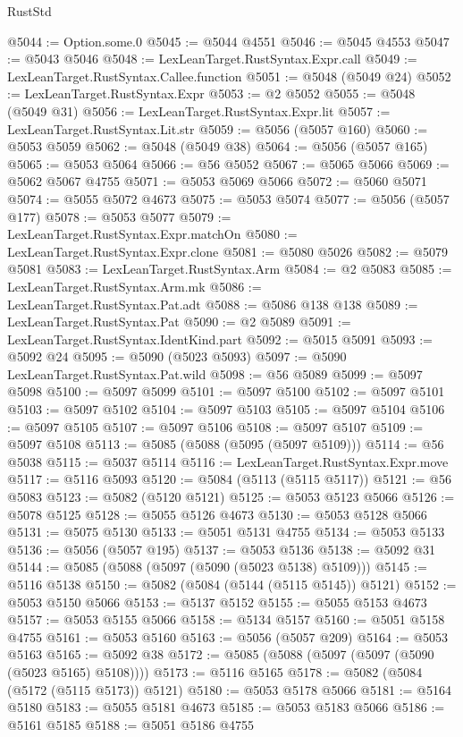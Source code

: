 \begin{lexlean}{RustStd}
\begin{coremodule}
@5044 := Option.some.{0}
@5045 := @5044 @4551
@5046 := @5045 @4553
@5047 := @5043 @5046
@5048 := LexLeanTarget.RustSyntax.Expr.call
@5049 := LexLeanTarget.RustSyntax.Callee.function
@5051 := @5048 (@5049 @24)
@5052 := LexLeanTarget.RustSyntax.Expr
@5053 := @2 @5052
@5055 := @5048 (@5049 @31)
@5056 := LexLeanTarget.RustSyntax.Expr.lit
@5057 := LexLeanTarget.RustSyntax.Lit.str
@5059 := @5056 (@5057 @160)
@5060 := @5053 @5059
@5062 := @5048 (@5049 @38)
@5064 := @5056 (@5057 @165)
@5065 := @5053 @5064
@5066 := @56 @5052
@5067 := @5065 @5066
@5069 := @5062 @5067 @4755
@5071 := @5053 @5069 @5066
@5072 := @5060 @5071
@5074 := @5055 @5072 @4673
@5075 := @5053 @5074
@5077 := @5056 (@5057 @177)
@5078 := @5053 @5077
@5079 := LexLeanTarget.RustSyntax.Expr.matchOn
@5080 := LexLeanTarget.RustSyntax.Expr.clone
@5081 := @5080 @5026
@5082 := @5079 @5081
@5083 := LexLeanTarget.RustSyntax.Arm
@5084 := @2 @5083
@5085 := LexLeanTarget.RustSyntax.Arm.mk
@5086 := LexLeanTarget.RustSyntax.Pat.adt
@5088 := @5086 @138 @138
@5089 := LexLeanTarget.RustSyntax.Pat
@5090 := @2 @5089
@5091 := LexLeanTarget.RustSyntax.IdentKind.part
@5092 := @5015 @5091
@5093 := @5092 @24
@5095 := @5090 (@5023 @5093)
@5097 := @5090 LexLeanTarget.RustSyntax.Pat.wild
@5098 := @56 @5089
@5099 := @5097 @5098
@5100 := @5097 @5099
@5101 := @5097 @5100
@5102 := @5097 @5101
@5103 := @5097 @5102
@5104 := @5097 @5103
@5105 := @5097 @5104
@5106 := @5097 @5105
@5107 := @5097 @5106
@5108 := @5097 @5107
@5109 := @5097 @5108
@5113 := @5085 (@5088 (@5095 (@5097 @5109)))
@5114 := @56 @5038
@5115 := @5037 @5114
@5116 := LexLeanTarget.RustSyntax.Expr.move
@5117 := @5116 @5093
@5120 := @5084 (@5113 (@5115 @5117))
@5121 := @56 @5083
@5123 := @5082 (@5120 @5121)
@5125 := @5053 @5123 @5066
@5126 := @5078 @5125
@5128 := @5055 @5126 @4673
@5130 := @5053 @5128 @5066
@5131 := @5075 @5130
@5133 := @5051 @5131 @4755
@5134 := @5053 @5133
@5136 := @5056 (@5057 @195)
@5137 := @5053 @5136
@5138 := @5092 @31
@5144 := @5085 (@5088 (@5097 (@5090 (@5023 @5138) @5109)))
@5145 := @5116 @5138
@5150 := @5082 (@5084 (@5144 (@5115 @5145)) @5121)
@5152 := @5053 @5150 @5066
@5153 := @5137 @5152
@5155 := @5055 @5153 @4673
@5157 := @5053 @5155 @5066
@5158 := @5134 @5157
@5160 := @5051 @5158 @4755
@5161 := @5053 @5160
@5163 := @5056 (@5057 @209)
@5164 := @5053 @5163
@5165 := @5092 @38
@5172 := @5085 (@5088 (@5097 (@5097 (@5090 (@5023 @5165) @5108))))
@5173 := @5116 @5165
@5178 := @5082 (@5084 (@5172 (@5115 @5173)) @5121)
@5180 := @5053 @5178 @5066
@5181 := @5164 @5180
@5183 := @5055 @5181 @4673
@5185 := @5053 @5183 @5066
@5186 := @5161 @5185
@5188 := @5051 @5186 @4755

\end{coremodule}
\end{lexlean}
